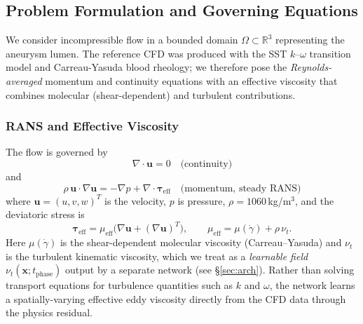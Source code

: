 \documentclass[11pt,a4paper]{article}
\begin{document}
\subsection{Problem Formulation and Governing Equations}
\label{sec:problem}

We consider incompressible flow in a bounded domain $\Omega \subset \mathbb{R}^3$ representing the aneurysm lumen. The reference CFD was produced with the SST $k$--$\omega$ transition model and Carreau-Yasuda blood rheology; we therefore pose the \emph{Reynolds-averaged} momentum and continuity equations with an effective viscosity that combines molecular (shear-dependent) and turbulent contributions.

\subsubsection{RANS and Effective Viscosity}

The flow is governed by
\begin{equation}
\nabla \cdot \mathbf{u} = 0 \quad \text{(continuity)}
\label{eq:continuity}
\end{equation}
and
\begin{equation}
\rho \, \mathbf{u} \cdot \nabla \mathbf{u} = -\nabla p + \nabla \cdot \boldsymbol{\tau}_{\text{eff}} \quad \text{(momentum, steady RANS)}
\label{eq:momentum}
\end{equation}
where $\mathbf{u} = (u,v,w)^T$ is the velocity, $p$ is pressure, $\rho = 1060$\,kg/m$^3$, and the deviatoric stress is
\begin{equation}
\boldsymbol{\tau}_{\text{eff}} = \mu_{\text{eff}} \bigl( \nabla\mathbf{u} + (\nabla\mathbf{u})^T \bigr), \qquad \mu_{\text{eff}} = \mu(\dot{\gamma}) + \rho\,\nu_t.
\label{eq:tau_eff}
\end{equation}
Here $\mu(\dot{\gamma})$ is the shear-dependent molecular viscosity (Carreau--Yasuda) and $\nu_t$ is the turbulent kinematic viscosity, which we treat as a \emph{learnable field} $\nu_t(\mathbf{x}; t_{\text{phase}})$ output by a separate network (see \S\ref{sec:arch}). Rather than solving transport equations for turbulence quantities such as $k$ and $\omega$, the network learns a spatially-varying effective eddy viscosity directly from the CFD data through the physics residual.
\end{document}
